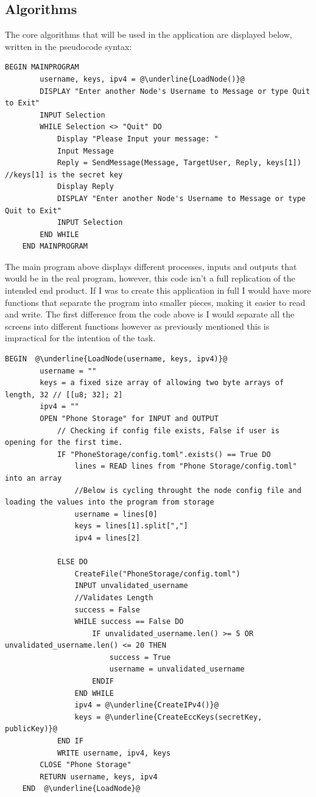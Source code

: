 \documentclass[a4paper, titlepage]{article}
\begin{document}
\subsection{Algorithms}

\renewcommand{\ttdefault}{pcr}

The core algorithms that will be used in the application are displayed below, written in the pseudocode syntax:

\begin{lstlisting}[caption=Main Program, escapechar=\@]
	BEGIN MAINPROGRAM
		username, keys, ipv4 = @\underline{LoadNode()}@
		DISPLAY "Enter another Node's Username to Message or type Quit to Exit"
		INPUT Selection
		WHILE Selection <> "Quit" DO
			Display "Please Input your message: "
			Input Message 	
			Reply = SendMessage(Message, TargetUser, Reply, keys[1]) //keys[1] is the secret key
			Display Reply
			DISPLAY "Enter another Node's Username to Message or type Quit to Exit"
			INPUT Selection
		END WHILE
	END MAINPROGRAM
\end{lstlisting}

The main program above displays different processes, inputs and outputs that would be in the real program, however, this code isn't a full replication of the intended end product. If I was to create this application in full I would have more functions that separate the program into smaller pieces, making it easier to read and write. The first difference from the code above is I would separate all the screens into different functions however as previously mentioned this is impractical for the intention of the task.

\begin{lstlisting}[caption=Load Node, escapechar=\@]
	BEGIN  @\underline{LoadNode(username, keys, ipv4)}@
		username = ""
		keys = a fixed size array of allowing two byte arrays of length, 32 // [[u8; 32]; 2]
		ipv4 = ""
		OPEN "Phone Storage" for INPUT and OUTPUT
			// Checking if config file exists, False if user is opening for the first time.
			IF "PhoneStorage/config.toml".exists() == True DO
				lines = READ lines from "Phone Storage/config.toml" into an array
				//Below is cycling throught the node config file and loading the values into the program from storage
				username = lines[0]
				keys = lines[1].split[","]
				ipv4 = lines[2]

			ELSE DO
				CreateFile("PhoneStorage/config.toml")
				INPUT unvalidated_username
				//Validates Length
				success = False
				WHILE success == False DO
					IF unvalidated_username.len() >= 5 OR unvalidated_username.len() <= 20 THEN
						success = True
						username = unvalidated_username
					ENDIF
				END WHILE
				ipv4 = @\underline{CreateIPv4()}@
				keys = @\underline{CreateEccKeys(secretKey, publicKey)}@
			END IF
			WRITE username, ipv4, keys
		CLOSE "Phone Storage"
		RETURN username, keys, ipv4
	END  @\underline{LoadNode}@
\end{lstlisting}
\end{document}
